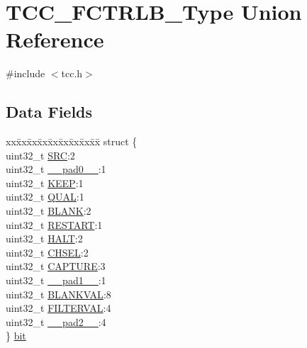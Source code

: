 \hypertarget{union_t_c_c___f_c_t_r_l_b___type}{}\section{T\+C\+C\+\_\+\+F\+C\+T\+R\+L\+B\+\_\+\+Type Union Reference}
\label{union_t_c_c___f_c_t_r_l_b___type}


{\ttfamily \#include $<$tcc.\+h$>$}

\subsection*{Data Fields}
\begin{DoxyCompactItemize}
\item 
\begin{tabbing}
xx\=xx\=xx\=xx\=xx\=xx\=xx\=xx\=xx\=\kill
struct \{\\
\>uint32\_t \mbox{\hyperlink{union_t_c_c___f_c_t_r_l_b___type_a306a1d33a25b1f2253b4b855b6e8c0d5}{SRC}}:2\\
\>uint32\_t \mbox{\hyperlink{union_t_c_c___f_c_t_r_l_b___type_a3e57c2ef1c3ffb36722f000cc1156824}{\_\_pad0\_\_}}:1\\
\>uint32\_t \mbox{\hyperlink{union_t_c_c___f_c_t_r_l_b___type_a4c5708c9d6836c3b0b6a2aa93d68a208}{KEEP}}:1\\
\>uint32\_t \mbox{\hyperlink{union_t_c_c___f_c_t_r_l_b___type_a95af12c73a0ffab9f7d13e991db9ea44}{QUAL}}:1\\
\>uint32\_t \mbox{\hyperlink{union_t_c_c___f_c_t_r_l_b___type_a19c83c8f9a20ed1d3947387614289cf0}{BLANK}}:2\\
\>uint32\_t \mbox{\hyperlink{union_t_c_c___f_c_t_r_l_b___type_ab492835f5a772d02c85d8ce8370ff02e}{RESTART}}:1\\
\>uint32\_t \mbox{\hyperlink{union_t_c_c___f_c_t_r_l_b___type_a6e45f491f9ac608334e69ee9f78040fc}{HALT}}:2\\
\>uint32\_t \mbox{\hyperlink{union_t_c_c___f_c_t_r_l_b___type_a23056283435a5ae76dbf0d9e0ae3eb0e}{CHSEL}}:2\\
\>uint32\_t \mbox{\hyperlink{union_t_c_c___f_c_t_r_l_b___type_a2db0dd0725840a5f0ecb3c763334315c}{CAPTURE}}:3\\
\>uint32\_t \mbox{\hyperlink{union_t_c_c___f_c_t_r_l_b___type_a6712ba6dd1d5b43d2d56ff8ac4e275a7}{\_\_pad1\_\_}}:1\\
\>uint32\_t \mbox{\hyperlink{union_t_c_c___f_c_t_r_l_b___type_aa247abf30aeb9f7bb81d11a85c5ab59c}{BLANKVAL}}:8\\
\>uint32\_t \mbox{\hyperlink{union_t_c_c___f_c_t_r_l_b___type_ae05a500ed332d12de0c6306919e8eb68}{FILTERVAL}}:4\\
\>uint32\_t \mbox{\hyperlink{union_t_c_c___f_c_t_r_l_b___type_a9ce12a63de64ef64ae2d59d128251cae}{\_\_pad2\_\_}}:4\\
\} \mbox{\hyperlink{union_t_c_c___f_c_t_r_l_b___type_a2728f320b1ab20ac1ac73b1917de4e10}{bit}}\\


\end{tabbing}
\end{DoxyCompactItemize}
